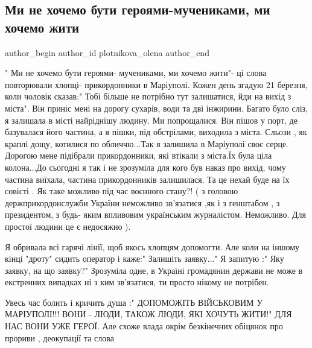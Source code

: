  
 
 
 
 

\subsection{Ми не хочемо бути  героями-мучениками,  ми хочемо жити}
\label{sec:27_04_2022.fb.plotnikova_olena.1.mi_ne_khochemo_buti_}

\ifcmt
 author_begin
   author_id plotnikova_olena
 author_end
\fi

" Ми не хочемо бути  героями- мучениками,  ми хочемо жити"- ці слова
повторювали хлопці- прикордонники в Маріуполі. Кожен день  згадую  21 березня,
коли чоловік  сказав:" Тобі більше  не  потрібно  тут залишатися, йди на вихід
з міста". Він приніс мені на дорогу  сухарів,  води та дві інжирини. Багато
було сліз, я залишала в місті найріднішу  людину. Ми попрощалися. Він пішов у
порт, де базувалася його частина, а я пішки,  під обстрілами,  виходила з
міста. Сльози , як краплі дощу, котилися по обличчю...Так я залишила в
Маріуполі  своє серце. Дорогою мене підібрали  прикордонники,  які втікали з
міста.Їх була ціла колона...До сьогодні  я так і не зрозуміла  для кого був
наказ про вихід, чому частина виїхала, частина прикордонників  залишилася. Та
це нехай буде  на їх совісті . Як таке можливо під час воєнного стану?! ( з
головою  держприкордонслужби  України  неможливо зв'язатися ,як і з генштабом ,
з президентом,  з будь- яким впливовим  українським журналістом. Неможливо. Для
простої людини це є недосяжно ). 

Я обривала всі  гарячі лінії,  щоб якось хлопцям допомогти. Але коли на іншому
кінці "дроту" сидить оператор  і каже:" Залишіть  заявку..." Я запитую :" Яку
заявку, на що заявку?"  Зрозуміла  одне, в Україні  громадянин держави не може
в екстренних випадках ні з ким зв'язатися,  ти просто нікому не потрібен.

Увесь час болить і кричить душа :" ДОПОМОЖІТЬ ВІЙСЬКОВИМ У МАРІУПОЛІ!!! ВОНИ -
ЛЮДИ, ТАКОЖ ЛЮДИ, ЯКІ ХОЧУТЬ ЖИТИ!" ДЛЯ НАС ВОНИ УЖЕ ГЕРОЇ. Але схоже влада
окрім безкінечних обіцянок про прориви , деокупації та слова 

